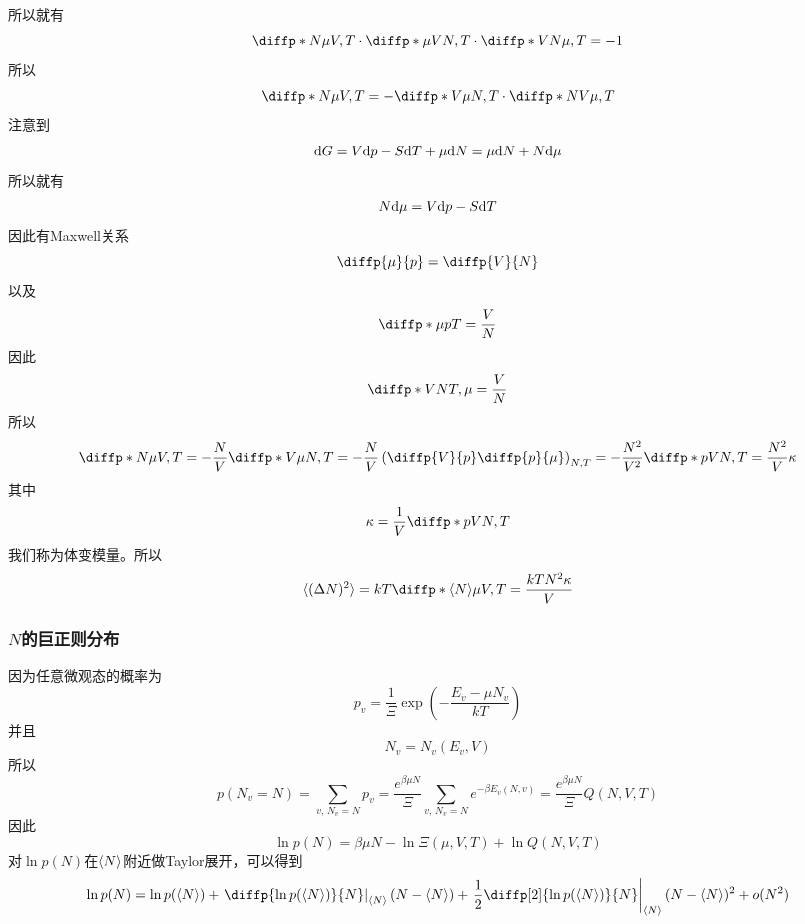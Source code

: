 所以就有\begin{equation}
       \diffp*{N}{\mu}{V,T}\cdot \diffp*{\mu}{V}{N,T}\cdot \diffp*{V}{N}{\mu,T}=-1
\end{equation}
所以\begin{equation}
       \diffp*{N}{\mu}{V,T}=-\diffp*{V}{\mu}{N,T}\cdot \diffp*{N}{V}{\mu,T}
\end{equation}
注意到\begin{equation}
       \mathrm{d} G=V\mathrm{d} p -S\mathrm{d} T +\mu \mathrm{d} N=\mu \mathrm{d} N+N\mathrm{d} \mu
\end{equation}
所以就有 \begin{equation}
       N\mathrm{d} \mu=V\mathrm{d} p-S\mathrm{d} T
\end{equation}
因此有Maxwell关系\begin{equation}
    \diffp{\mu}{p}=\diffp{V}{N}   
\end{equation}
以及\begin{equation}
       \diffp*{\mu}{p}{T}=\frac{V}{N}
\end{equation}
因此\begin{equation}
       \diffp*{V}{N}{T,\mu}=\frac{V}{N}
\end{equation}
所以\begin{equation}
       \diffp*{N}{\mu}{V,T}=-\frac{N}{V}\diffp*{V}{\mu}{N,T}=-\frac{N}{V} \left(\diffp{V}{p}\diffp{p}{\mu}\right)_{N,T}=-\frac{N^2}{V^2} \diffp*{p}{V}{N,T}=\frac{N^2}{V}\kappa
\end{equation}
其中\begin{equation}
       \kappa=\frac{1}{V}\diffp*{p}{V}{N,T}
\end{equation}
我们称为体变模量。所以\begin{equation}
       \braket{(\Delta N)^2}=kT \diffp*{\braket{N}}{\mu}{V,T}=\frac{kTN^2\kappa}{V}
\end{equation}
\subsubsection{$N$的巨正则分布} %
\label{ssub:N的巨正则分布}
因为任意微观态的概率为
\begin{equation}
       p_v=\frac{1}{\displaystyle \Xi} \exp\left(-\frac{E_v-\mu N_v}{kT}\right)
\end{equation}
并且\begin{equation}
       N_v=N_v(E_v,V)
\end{equation}
所以\begin{equation}
       p(N_v=N)=\sum_{v,\,N_v=N} p_v=\frac{e^{\beta\mu N}}{\displaystyle \Xi} \sum_{v,\,N_v=N} e^{-\beta E_v(N,v)} =\frac{e^{\beta\mu N}}{\displaystyle \Xi} Q(N,V,T)
\end{equation}
因此\begin{equation}
       \ln p(N) =\beta\mu N -\ln \Xi(\mu,V,T) +\ln Q(N,V,T)
\end{equation}
对$\ln p(N)$在$\braket{N}$附近做Taylor展开，可以得到\begin{equation}
       \ln p(N) =\ln p(\braket{N})+\left.\diffp{\ln p(\braket{N})}{N}\right|_{\braket{N}}(N-\braket{N}) +\left.\frac{1}{2}\diffp[2]{\ln p(\braket{N})}{N}\right|_{\braket{N}} (N-\braket{N})^2 +o(N^2)
\end{equation}

